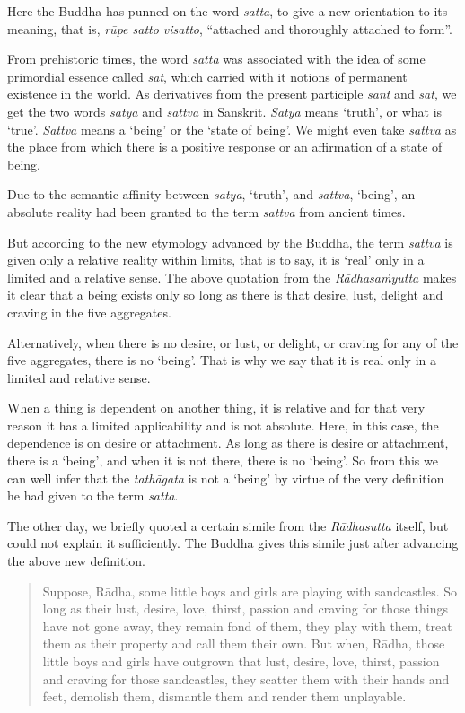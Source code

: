 Here the Buddha has punned on the word \emph{satta}, to give a new orientation to its meaning, that is, \emph{rūpe satto visatto}, ``attached and thoroughly attached to form''.

From prehistoric times, the word \emph{satta} was associated with the idea of some primordial essence called \emph{sat}, which carried with it notions of permanent existence in the world. As derivatives from the present participle \emph{sant} and \emph{sat}, we get the two words \emph{satya} and \emph{sattva} in Sanskrit. \emph{Satya} means `truth', or what is `true'. \emph{Sattva} means a `being' or the `state of being'. We might even take \emph{sattva} as the place from which there is a positive response or an affirmation of a state of being.

Due to the semantic affinity between \emph{satya}, `truth', and \emph{sattva}, `being', an absolute reality had been granted to the term \emph{sattva} from ancient times.

But according to the new etymology advanced by the Buddha, the term \emph{sattva} is given only a relative reality within limits, that is to say, it is `real' only in a limited and a relative sense. The above quotation from the \emph{Rādhasaṁyutta} makes it clear that a being exists only so long as there is that desire, lust, delight and craving in the five aggregates.

Alternatively, when there is no desire, or lust, or delight, or craving for any of the five aggregates, there is no `being'. That is why we say that it is real only in a limited and relative sense.

When a thing is dependent on another thing, it is relative and for that very reason it has a limited applicability and is not absolute. Here, in this case, the dependence is on desire or attachment. As long as there is desire or attachment, there is a `being', and when it is not there, there is no `being'. So from this we can well infer that the \emph{tathāgata} is not a `being' by virtue of the very definition he had given to the term \emph{satta}.

The other day, we briefly quoted a certain simile from the \emph{Rādhasutta} itself, but could not explain it sufficiently. The Buddha gives this simile just after advancing the above new definition.

\begin{quote}
Suppose, Rādha, some little boys and girls are playing with sandcastles. So long as their lust, desire, love, thirst, passion and craving for those things have not gone away, they remain fond of them, they play with them, treat them as their property and call them their own. But when, Rādha, those little boys and girls have outgrown that lust, desire, love, thirst, passion and craving for those sandcastles, they scatter them with their hands and feet, demolish them, dismantle them and render them unplayable.
\end{quote}

